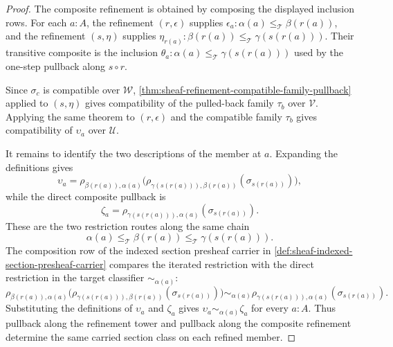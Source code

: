 \begin{proof}
The composite refinement is obtained by composing the displayed inclusion rows. For each $a:A$, the refinement $(r,\epsilon)$ supplies $\epsilon_a:\alpha(a)\le_{\mathcal{T}}\beta(r(a))$, and the refinement $(s,\eta)$ supplies $\eta_{r(a)}:\beta(r(a))\le_{\mathcal{T}}\gamma(s(r(a)))$. Their transitive composite is the inclusion $\theta_a:\alpha(a)\le_{\mathcal{T}}\gamma(s(r(a)))$ used by the one-step pullback along $s\circ r$.

Since $\sigma_c$ is compatible over $\mathcal{W}$, \autoref{thm:sheaf-refinement-compatible-family-pullback} applied to $(s,\eta)$ gives compatibility of the pulled-back family $\tau_b$ over $\mathcal{V}$. Applying the same theorem to $(r,\epsilon)$ and the compatible family $\tau_b$ gives compatibility of $\upsilon_a$ over $\mathcal{U}$.

It remains to identify the two descriptions of the member at $a$. Expanding the definitions gives
$$
\upsilon_a
=
\rho_{\beta(r(a)),\alpha(a)}
\bigl(\rho_{\gamma(s(r(a))),\beta(r(a))}(\sigma_{s(r(a))})\bigr),
$$
while the direct composite pullback is
$$
\zeta_a
=
\rho_{\gamma(s(r(a))),\alpha(a)}(\sigma_{s(r(a))}).
$$
These are the two restriction routes along the same chain
$$
\alpha(a)\le_{\mathcal{T}}\beta(r(a))\le_{\mathcal{T}}\gamma(s(r(a))).
$$
The composition row of the indexed section presheaf carrier in \autoref{def:sheaf-indexed-section-presheaf-carrier} compares the iterated restriction with the direct restriction in the target classifier $\sim_{\alpha(a)}$:
$$
\rho_{\beta(r(a)),\alpha(a)}
\bigl(\rho_{\gamma(s(r(a))),\beta(r(a))}(\sigma_{s(r(a))})\bigr)
\sim_{\alpha(a)}
\rho_{\gamma(s(r(a))),\alpha(a)}(\sigma_{s(r(a))}).
$$
Substituting the definitions of $\upsilon_a$ and $\zeta_a$ gives $\upsilon_a\sim_{\alpha(a)}\zeta_a$ for every $a:A$. Thus pullback along the refinement tower and pullback along the composite refinement determine the same carried section class on each refined member.
\end{proof}
